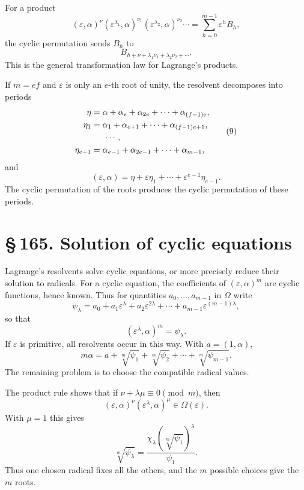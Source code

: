 \documentclass[11pt]{article}
\providecommand{\sect}[2]{\section*{\S\,#1. #2}}
\begin{document}
For a product
\[
        (\varepsilon,\alpha)^{\nu}
        (\varepsilon^{\lambda_1},\alpha)^{\nu_1}
        (\varepsilon^{\lambda_2},\alpha)^{\nu_2}
        \cdots
        =\sum_{h=0}^{m-1}\varepsilon^h B_h,                              \tag{7}
\]
the cyclic permutation sends $B_h$ to
\[
        B_{h+\nu+
        \lambda_1\nu_1+
        \lambda_2\nu_2+
        \cdots}.
\]
This is the general transformation law for Lagrange's products.

If $m=ef$ and $\varepsilon$ is only an $e$-th root of unity, the resolvent decomposes into periods
\[
\begin{aligned}
\eta      &=\alpha+\alpha_e+
             \alpha_{2e}+\cdots+
             \alpha_{(f-1)e},\\
\eta_1    &=\alpha_1+
             \alpha_{e+1}+\cdots+
             \alpha_{(f-1)e+1},\\
&\hspace{1.5em}\cdots,\\
\eta_{e-1}&=\alpha_{e-1}+
             \alpha_{2e-1}+\cdots+
             \alpha_{m-1},
\end{aligned}                                                          \tag{9}
\]
and
\[
        (\varepsilon,\alpha)=
        \eta+
        \varepsilon\eta_1+
        \cdots+
        \varepsilon^{e-1}\eta_{e-1}.                                   \tag{10}
\]
The cyclic permutation of the roots produces the cyclic permutation of these periods.

\sect{165}{Solution of cyclic equations}

Lagrange's resolvents solve cyclic equations, or more precisely reduce their solution to radicals. For a cyclic equation, the coefficients of $(\varepsilon,\alpha)^m$ are cyclic functions, hence known. Thus for quantities $a_0,
\ldots,a_{m-1}$ in $\Omega$ write
\[
        \psi_\lambda=a_0+a_1\varepsilon^\lambda+
        a_2\varepsilon^{2\lambda}+
        \cdots+a_{m-1}\varepsilon^{(m-1)\lambda},                      \tag{1}
\]
so that
\[
        (\varepsilon^\lambda,\alpha)^m=\psi_\lambda.                    \tag{2}
\]
If $\varepsilon$ is primitive, all resolvents occur in this way. With $a=(1,
\alpha)$,
\[
        m\alpha=a+\sqrt[m]{\psi_1}+
        \sqrt[m]{\psi_2}+
        \cdots+
        \sqrt[m]{\psi_{m-1}}.                                           \tag{3}
\]
The remaining problem is to choose the compatible radical values.

The product rule shows that if $\nu+
\lambda\mu\equiv0\pmod m$, then
\[
        (\varepsilon,\alpha)^\nu
        (\varepsilon^\lambda,
        \alpha)^\mu\in\Omega(\varepsilon).
\]
With $\mu=1$ this gives
\[
        \sqrt[m]{\psi_\lambda}=
        \frac{\chi_\lambda
        (\sqrt[m]{\psi_1})^\lambda}{\psi_1}.                            \tag{4}
\]
Thus one chosen radical fixes all the others, and the $m$ possible choices give the $m$ roots.
\end{document}

